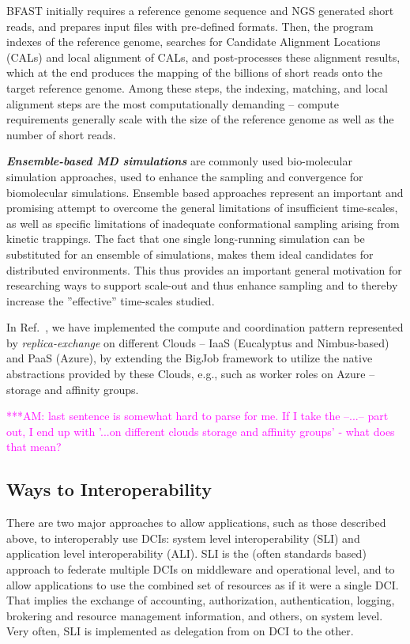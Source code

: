 \documentclass[10pt,conference,final,letterpaper,twoside,twocolumn,]{IEEEtran}
\newcommand{\amnote}[1]{  {\textcolor{magenta} {***AM: #1}}}
\newcommand{\amnote}[1]{}
\newcommand{\I}[1]{\textit{#1}}
\newcommand{\B}[1]{\textbf{#1}}
\newcommand{\BI}[1]{\B{\I{#1}}}
\begin{document}
 BFAST initially requires a reference genome sequence and NGS
 generated short reads, and prepares input files with pre-defined
 formats.  Then, the program indexes of the reference genome, searches
 for Candidate Alignment Locations (CALs) and local alignment of CALs,
 and post-processes these alignment results, which at the end produces
 the mapping of the billions of short reads onto the target reference
 genome.  Among these steps, the indexing, matching, and local
 alignment steps are the most computationally demanding -- compute
 requirements generally scale with the size of the reference genome as
 well as the number of short reads.
 
 \BI{Ensemble-based MD simulations} are commonly used bio-molecular
 simulation approaches, used to enhance the sampling and convergence
 for biomolecular simulations.  Ensemble based approaches represent an
 important and promising attempt to overcome the general limitations
 of insufficient time-scales, as well as specific limitations of
 inadequate conformational sampling arising from kinetic trappings.
 The fact that one single long-running simulation can be substituted
 for an ensemble of simulations, makes them ideal candidates for
 distributed environments.  This thus provides an important general
 motivation for researching ways to support scale-out and thus enhance
 sampling and to thereby increase the ''effective'' time-scales
 studied.
 
 In Ref.~\cite{ccgrid10, cloudcom10}, we have implemented the
 compute and coordination pattern represented by
 \I{replica-exchange} on different Clouds -- IaaS (Eucalyptus and
 Nimbus-based) and PaaS (Azure), by extending the BigJob framework
 to utilize the native abstractions provided by these Clouds, e.g.,
 such as worker roles on Azure -- storage and affinity groups.

 \amnote{last sentence is somewhat hard to parse for me.  If I take
 the --...-- part out, I end up with '...on different clouds storage
 and affinity groups' - what does that mean?}
 

 \subsection*{Ways to Interoperability}
 
 There are two major approaches to allow applications, such as those
 described above, to interoperably use DCIs: system level
 interoperability (SLI) and application level interoperability (ALI).
 SLI is the (often standards based) approach to federate multiple DCIs
 on middleware and operational level, and to allow applications to use
 the combined set of resources as if it were a single DCI.  That
 implies the exchange of accounting, authorization, authentication,
 logging, brokering and resource management information, and others,
 on system level.  Very often, SLI is implemented as delegation from
 on DCI to the other.
\end{document}
